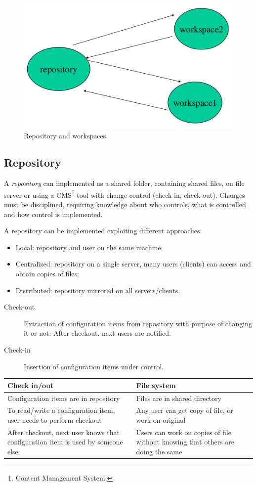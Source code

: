 \begin{figure}[hbtp]
\centering
\includegraphics[scale=0.3]{images/repository_workspace.png}
\caption{Repository and workspaces}
\end{figure}

\subsection{Repository}
A \emph{repository} can implemented as a shared folder, containing shared files, on file server or using a CMS\footnote{Content Management System.} tool with change control (check-in, check-out). Changes must be disciplined, requiring knowledge about who controls, what is controlled and how control is implemented.

A repository can be implemented exploiting different approaches:
\begin{itemize}
\item Local: repository and user on the same machine;
\item Centralized: repository on a single server, many users (clients) can access and obtain copies of files;
\item Distributed: repository mirrored on all servers/clients.
\end{itemize}

\begin{description}
\item [Check-out] Extraction of configuration items from repository with purpose of changing it or not. After checkout. next users are notified.
\item [Check-in] Insertion of configuration items under control.
\end{description}

\begin{center}
\begin{tabularx}{\textwidth}{X|X}
\textbf{Check in/out} & \textbf{File system} \\
\hline
Configuration items are in repository & Files are in shared directory \\
\hline
To read/write a configuration item, user needs to perform checkout & Any user can get copy of file, or work on original \\
\hline
After checkout, next user knows that configuration item is used by someone else & Users can work on copies of file without knowing that others are doing the same
\end{tabularx}
\end{center}

